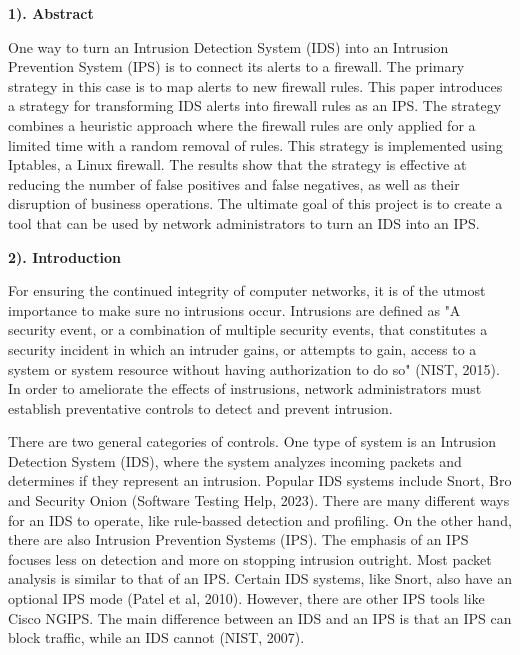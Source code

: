 \documentclass[12pt]{article}
\begin{document}
\begin{flushleft}

\justifying

\setlength{\parindent}{0.5in}

\begin{multicols}{2}
    
\textbf{1). Abstract}

One way to turn an Intrusion Detection System (IDS) into an Intrusion Prevention System (IPS) is to connect its alerts to a firewall. The primary strategy in this case is to map alerts to new firewall rules. This paper introduces a strategy for transforming IDS alerts into firewall rules as an IPS. The strategy combines a heuristic approach where the firewall rules are only applied for a limited time with a random removal of rules. This strategy is implemented using Iptables, a Linux firewall. The results show that the strategy is effective at reducing the number of false positives and false negatives, as well as their disruption of business operations. The ultimate goal of this project is to create a tool that can be used by network administrators to turn an IDS into an IPS.

\textbf{2). Introduction}

For ensuring the continued integrity of computer networks, it is of the utmost importance to make sure no intrusions occur. Intrusions are defined as "A security event, or a combination of multiple security events, that constitutes a security incident in which an intruder gains, or attempts to gain, access to a system or system resource without having authorization to do so" (NIST, 2015). In order to ameliorate the effects of instrusions, network administrators must establish preventative controls to detect and prevent intrusion.

There are two general categories of controls. One type of system is an Intrusion Detection System (IDS), where the system analyzes incoming packets and determines if they represent an intrusion. Popular IDS systems include Snort, Bro and Security Onion (Software Testing Help, 2023). There are many different ways for an IDS to operate, like rule-bassed detection and profiling. On the other hand, there are also Intrusion Prevention Systems (IPS). The emphasis of an IPS focuses less on detection and more on stopping intrusion outright. Most packet analysis is similar to that of an IPS. Certain IDS systems, like Snort, also have an optional IPS mode (Patel et al, 2010). However, there are other IPS tools like Cisco NGIPS. The main difference between an IDS and an IPS is that an IPS can block traffic, while an IDS cannot (NIST, 2007).


\end{multicols}
\end{flushleft}
\end{document}
